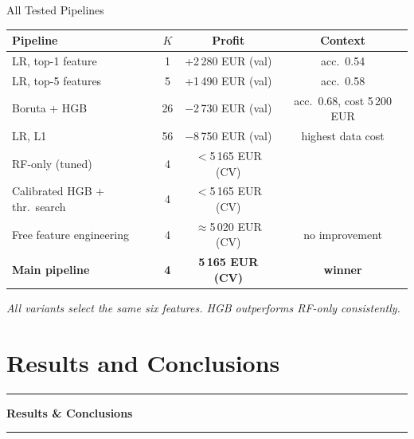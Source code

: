 \documentclass[aspectratio=169,10pt]{beamer}
\newcommand{\sectionslide}[1]{%
  \begin{frame}[plain]
    \centering\vfill
    \textcolor{mid}{\rule{0.10\textwidth}{0.3pt}}\par\vspace{0.5em}
    {\large\bfseries #1}\par\vspace{0.5em}
    \textcolor{mid}{\rule{0.10\textwidth}{0.3pt}}
    \vfill
  \end{frame}%
}
\begin{document}
\begin{frame}{All Tested Pipelines}
\begin{center}
\footnotesize
\begin{tabular}{@{}lccc@{}}
\toprule
Pipeline & $K$ & Profit & Context \\
\midrule
LR, top-1 feature             & 1  & +2\,280 EUR (val) & acc.\ 0.54 \\
LR, top-5 features            & 5  & +1\,490 EUR (val) & acc.\ 0.58 \\
Boruta + HGB                  & 26 & $-$2\,730 EUR (val) & acc.\ 0.68, cost 5\,200 EUR \\
LR, L1                        & 56 & $-$8\,750 EUR (val) & highest data cost \\
RF-only (tuned)               & 4  & $<$5\,165 EUR (CV) & \\
Calibrated HGB + thr.\ search & 4  & $<$5\,165 EUR (CV) & \\
Free feature engineering      & 4  & $\approx$5\,020 EUR (CV) & no improvement \\
\textbf{Main pipeline}        & \textbf{4} & \textbf{5\,165 EUR (CV)} & \textbf{winner} \\
\bottomrule
\end{tabular}
\end{center}

\vspace{0.25em}
{\footnotesize\itshape All variants select the same six features. HGB outperforms RF-only consistently.}
\end{frame}

\section{Results and Conclusions}
\sectionslide{Results \& Conclusions}
\end{document}
